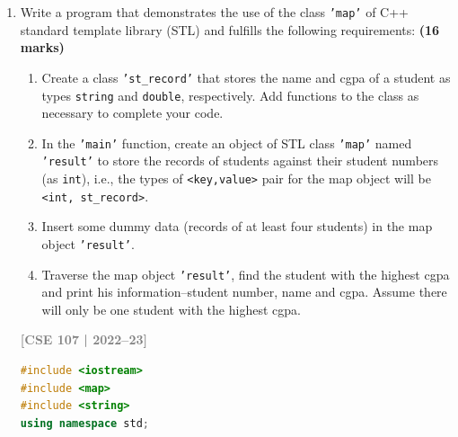 \documentclass[12pt,a3paper]{article}
\newcommand{\yr}[1]{\hfill\textcolor{gray}{\small\textbf{[#1]}}}
\newcommand{\mk}[1]{\textcolor{orange!70!black}{\small\textbf{(#1 marks)}}}
\begin{document}
\begin{enumerate}
\begin{tcolorbox}
\begin{lstlisting}[language=C++]
int main(){
    myclass<double>    d1(1.1);   // Uses primary (N=1): 1.1*1=1.1
    myclass<double, 2> d2(1.1);   // Uses primary (N=2): 1.1*2=2.2
    myclass<double, 3> d3(1.1);   // Uses primary (N=3): 1.1*3=3.3
    cout << d1.getx() << " " << d2.getx() << " " << d3.getx() << "\n";
    // Output: 1.1 2.2 3.3

    myclass<int, 4> i1(5);        // Uses primary (T=int, N=4): 5*4=20
    myclass<int>    i2(5);        // Uses specialization <int, 1>: 5*5=25
    cout << i1.getx() << " " << i2.getx() << "\n"; 
    // Output: 20 25
    
    return 0;
}
\end{lstlisting}

\end{tcolorbox}
\item Write a program that demonstrates the use of the class \texttt{'map'} of C++ standard template library (STL) and fulfills the following requirements: \mk{16}
\begin{enumerate}
    \item Create a class \texttt{'st\_record'} that stores the name and cgpa of a student as types \texttt{string} and \texttt{double}, respectively. Add functions to the class as necessary to complete your code.
    \item In the \texttt{'main'} function, create an object of STL class \texttt{'map'} named \texttt{'result'} to store the records of students against their student numbers (as \texttt{int}), i.e., the types of \texttt{<key,value>} pair for the map object will be \texttt{<int, st\_record>}.
    \item Insert some dummy data (records of at least four students) in the map object \texttt{'result'}.
    \item Traverse the map object \texttt{'result'}, find the student with the highest cgpa and print his information--student number, name and cgpa. Assume there will only be one student with the highest cgpa.
\end{enumerate}
\yr{CSE 107 | 2022--23}

\begin{tcolorbox}[enhanced,breakable,ansbox,colback=cH!4,colframe=cH,
  boxrule=0.8pt,arc=5pt,
  title={\textbf{Answer --- STL map with st\_record; find student with highest CGPA}},
  fonttitle=\bfseries\color{white},colbacktitle=cH]

\begin{lstlisting}[language=C++]
#include <iostream>
#include <map>
#include <string>
using namespace std;


\end{lstlisting}
\end{tcolorbox}
\end{enumerate}
\end{document}
